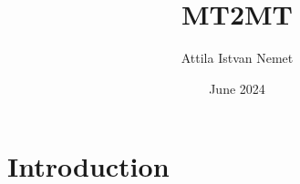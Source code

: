 \documentclass{article}
\title{MT2MT}
\author{Attila Istvan Nemet}
\date{June 2024}
\begin{document}
\maketitle

\section{Introduction}
\end{document}
